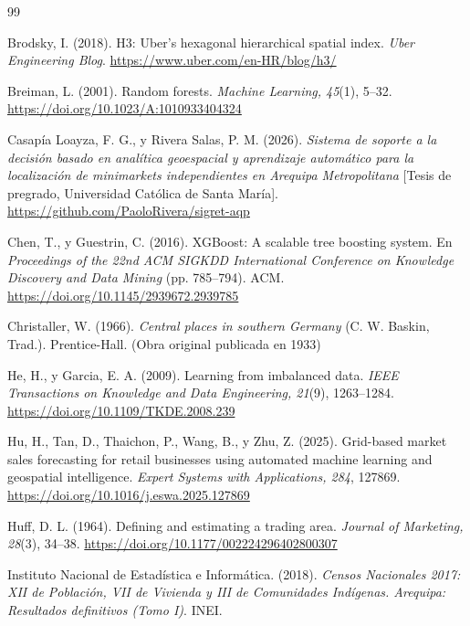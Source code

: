 \documentclass[10pt,letterpaper,twocolumn]{article}
\begin{document}
\balance
\begin{thebibliography}{99}
\footnotesize
\setlength{\parindent}{-0.45cm}\setlength{\leftskip}{0.45cm}

 Brodsky, I. (2018). H3: Uber's hexagonal hierarchical spatial index. \textit{Uber Engineering Blog}. \url{https://www.uber.com/en-HR/blog/h3/}

 Breiman, L. (2001). Random forests. \textit{Machine Learning, 45}(1), 5--32. \url{https://doi.org/10.1023/A:1010933404324}

 Casapía Loayza, F. G., y Rivera Salas, P. M. (2026). \textit{Sistema de soporte a la decisión basado en analítica geoespacial y aprendizaje automático para la localización de minimarkets independientes en Arequipa Metropolitana} [Tesis de pregrado, Universidad Católica de Santa María]. \url{https://github.com/PaoloRivera/sigret-aqp}

 Chen, T., y Guestrin, C. (2016). XGBoost: A scalable tree boosting system. En \textit{Proceedings of the 22nd ACM SIGKDD International Conference on Knowledge Discovery and Data Mining} (pp. 785--794). ACM. \url{https://doi.org/10.1145/2939672.2939785}

 Christaller, W. (1966). \textit{Central places in southern Germany} (C. W. Baskin, Trad.). Prentice-Hall. (Obra original publicada en 1933)

 He, H., y Garcia, E. A. (2009). Learning from imbalanced data. \textit{IEEE Transactions on Knowledge and Data Engineering, 21}(9), 1263--1284. \url{https://doi.org/10.1109/TKDE.2008.239}

 Hu, H., Tan, D., Thaichon, P., Wang, B., y Zhu, Z. (2025). Grid-based market sales forecasting for retail businesses using automated machine learning and geospatial intelligence. \textit{Expert Systems with Applications, 284}, 127869. \url{https://doi.org/10.1016/j.eswa.2025.127869}

 Huff, D. L. (1964). Defining and estimating a trading area. \textit{Journal of Marketing, 28}(3), 34--38. \url{https://doi.org/10.1177/002224296402800307}

 Instituto Nacional de Estadística e Informática. (2018). \textit{Censos Nacionales 2017: XII de Población, VII de Vivienda y III de Comunidades Indígenas. Arequipa: Resultados definitivos (Tomo I)}. INEI.


\end{thebibliography}
\end{document}
